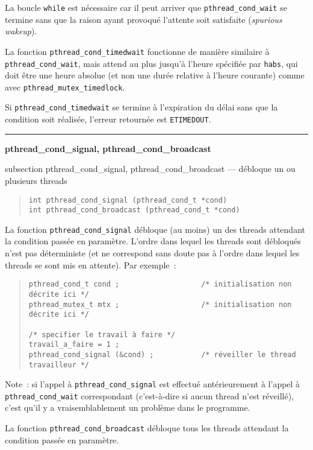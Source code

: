 \documentclass [twoside] {report}
\newcommand {\primitive} [1]
    {
	\phantomsection
	{\large \bf #1}
	\addcontentsline {toc} {subsection} {#1}
    }
\newcommand {\separation}
    {
	\vspace {5mm}
	\nopagebreak
	\hrule
    }
\begin{document}
La boucle \texttt {while} est nécessaire car il peut arriver que
\verb|pthread_cond_wait| se termine sans que la raison ayant provoqué
l'attente soit satisfaite (\textit {spurious wakeup}).

La fonction \verb|pthread_cond_timedwait| fonctionne de manière
similaire à \verb|pthread_cond_wait|, mais attend au plus jusqu'à
l'heure spécifiée par \texttt {habs}, qui doit être une heure absolue
(et non une durée relative à l'heure courante) comme avec
\verb|pthread_mutex_timedlock|.

Si \verb|pthread_cond_timedwait| se termine à l'expiration du délai
sans que la condition soit réalisée, l'erreur retournée est \texttt
{ETIMEDOUT}.


\separation
\primitive {pthread\_cond\_signal, pthread\_cond\_broadcast} --- débloque un ou plusieurs threads

\begin {quote}
\begin {verbatim}
int pthread_cond_signal (pthread_cond_t *cond)
int pthread_cond_broadcast (pthread_cond_t *cond)
\end{verbatim}
\end {quote}

La fonction \verb|pthread_cond_signal| débloque (au moins) un des threads
attendant la condition passée en paramètre. L'ordre dans lequel les
threads sont débloqués n'est pas déterministe (et ne correspond sans
doute pas à l'ordre dans lequel les threads se sont mis en attente).
Par exemple~:

\begin {quote}
\small
\begin {verbatim}
pthread_cond_t cond ;                   /* initialisation non décrite ici */
pthread_mutex_t mtx ;                   /* initialisation non décrite ici */

/* specifier le travail à faire */
travail_a_faire = 1 ;
pthread_cond_signal (&cond) ;           /* réveiller le thread travailleur */
\end{verbatim}
\end {quote}

Note~: si l'appel à \verb|pthread_cond_signal| est effectué
antérieurement à l'appel à \verb|pthread_cond_wait| correspondant
(c'est-à-dire si aucun thread n'est réveillé), c'est qu'il y a
vraisemblablement un problème dans le programme.

La fonction \verb|pthread_cond_broadcast| débloque tous les threads
attendant la condition passée en paramètre.
\end{document}

